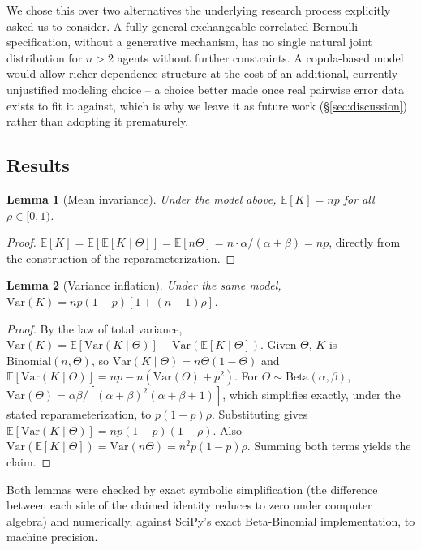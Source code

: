 \documentclass[journal]{IEEEtran}
\newtheorem{lemma}{Lemma}
\begin{document}
We chose this over two alternatives the underlying research process explicitly asked us to consider. A fully general exchangeable-correlated-Bernoulli specification, without a generative mechanism, has no single natural joint distribution for $n>2$ agents without further constraints. A copula-based model would allow richer dependence structure at the cost of an additional, currently unjustified modeling choice -- a choice better made once real pairwise error data exists to fit it against, which is why we leave it as future work (\S\ref{sec:discussion}) rather than adopting it prematurely.

\subsection{Results}

\begin{lemma}[Mean invariance]
\label{lem:mean}
Under the model above, $\mathbb{E}[K] = np$ for all $\rho \in [0,1)$.
\end{lemma}
\begin{proof}
$\mathbb{E}[K] = \mathbb{E}[\mathbb{E}[K\mid\Theta]] = \mathbb{E}[n\Theta] = n\cdot\alpha/(\alpha+\beta) = np$, directly from the construction of the reparameterization.
\end{proof}

\begin{lemma}[Variance inflation]
\label{lem:var}
Under the same model, $\mathrm{Var}(K) = np(1-p)\left[1+(n-1)\rho\right]$.
\end{lemma}
\begin{proof}
By the law of total variance, $\mathrm{Var}(K) = \mathbb{E}[\mathrm{Var}(K\mid\Theta)] + \mathrm{Var}(\mathbb{E}[K\mid\Theta])$. Given $\Theta$, $K$ is $\mathrm{Binomial}(n,\Theta)$, so $\mathrm{Var}(K\mid\Theta)=n\Theta(1-\Theta)$ and $\mathbb{E}[\mathrm{Var}(K\mid\Theta)] = np - n(\mathrm{Var}(\Theta)+p^2)$. For $\Theta\sim\mathrm{Beta}(\alpha,\beta)$, $\mathrm{Var}(\Theta)=\alpha\beta/[(\alpha+\beta)^2(\alpha+\beta+1)]$, which simplifies exactly, under the stated reparameterization, to $p(1-p)\rho$. Substituting gives $\mathbb{E}[\mathrm{Var}(K\mid\Theta)] = np(1-p)(1-\rho)$. Also $\mathrm{Var}(\mathbb{E}[K\mid\Theta]) = \mathrm{Var}(n\Theta) = n^2 p(1-p)\rho$. Summing both terms yields the claim.
\end{proof}

Both lemmas were checked by exact symbolic simplification (the difference between each side of the claimed identity reduces to zero under computer algebra) and numerically, against SciPy's exact Beta-Binomial implementation, to machine precision.
\end{document}
